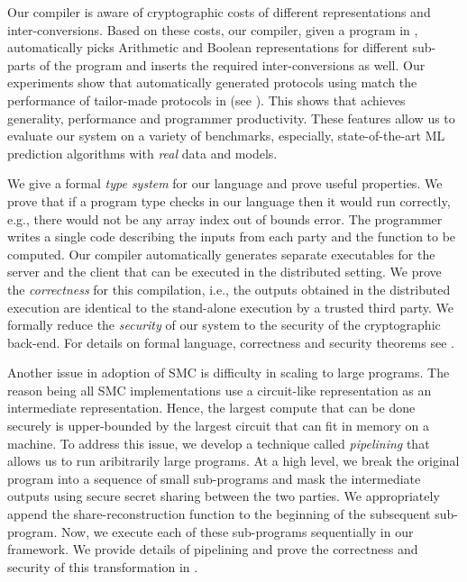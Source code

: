 Our compiler is aware of cryptographic costs of different representations and inter-conversions.  Based on these costs, our compiler, given a program in \tool, automatically picks Arithmetic and Boolean representations for different sub-parts of the program and inserts the required inter-conversions as well. 
Our experiments show that automatically generated protocols using \tool match the performance of tailor-made protocols in \cite{minionn,shafindss} (see ). This shows that  \tool achieves generality, performance and programmer productivity. These features allow us to evaluate our system on a variety of benchmarks, especially, state-of-the-art ML prediction algorithms with \emph{real} data and models. 

We give a formal {\em type system} for our language and prove useful properties. We prove that if a program type checks in our language then it would run correctly, e.g., there would not be any array index out of bounds error. The programmer writes a single code describing the inputs from each party and the function to be computed. Our compiler automatically generates separate executables for the server and the client that can be executed in the distributed setting. We prove the {\em correctness} for this compilation, i.e., the outputs obtained in the distributed execution are identical to the stand-alone execution by a trusted third party. We formally reduce the {\em security} of our system to the security of the cryptographic back-end. For details on formal language, correctness and security theorems see .

Another issue in adoption of SMC is difficulty in scaling to large programs. 
The reason being all SMC implementations use a circuit-like representation as an intermediate representation. Hence, the largest compute that can be done securely is upper-bounded by the largest circuit that can fit in memory on a machine.
To address this issue, we develop a technique called \emph{pipelining} that allows us to run aribitrarily large programs. At a high level, we break the original program into a sequence of small sub-programs and mask the intermediate outputs using secure secret sharing between the two parties. We appropriately append the share-reconstruction function to the beginning of the subsequent sub-program. Now, we execute each of these sub-programs sequentially in our framework. We provide details of pipelining and prove the correctness and security of this transformation in .

